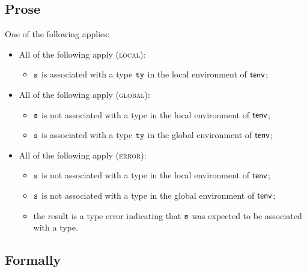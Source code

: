 \subsection{Prose}
One of the following applies:
\begin{itemize}
  \item All of the following apply (\textsc{local}):
  \begin{itemize}
    \item $\texttt{s}$ is associated with a type $\texttt{ty}$ in the local environment of $\textsf{tenv}$;
  \end{itemize}

  \item All of the following apply (\textsc{global}):
  \begin{itemize}
    \item $\texttt{s}$ is not associated with a type in the local environment of $\textsf{tenv}$;
    \item $\texttt{s}$ is associated with a type $\texttt{ty}$ in the global environment of $\textsf{tenv}$;
  \end{itemize}

  \item All of the following apply (\textsc{error}):
  \begin{itemize}
    \item $\texttt{s}$ is not associated with a type in the local environment of $\textsf{tenv}$;
    \item $\texttt{s}$ is not associated with a type in the global environment of $\textsf{tenv}$;
    \item the result is a type error indicating that $\texttt{s}$ was expected to be associated
          with a type.
  \end{itemize}
\end{itemize}

\subsection{Formally}

